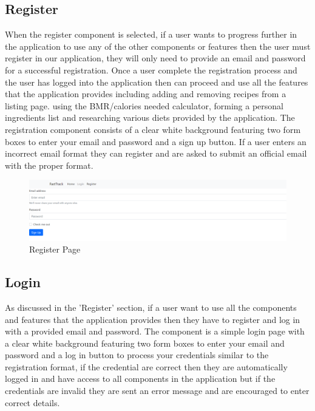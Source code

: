 \subsection{Register}

When the register component is selected, if a user wants to progress further in the application to use any of the other components or features then the user must register in our application, they will only need to provide an email and password for a successful registration. Once a user complete the registration process and the user has logged into the application then can proceed and use all the features that the application provides including adding and removing recipes from a listing page. using the BMR/calories needed calculator, forming a personal ingredients list and researching various diets provided by the application. The registration component consists of a clear white background featuring two form boxes to enter your email and password and a sign up button. If a user enters an incorrect email format they can register and are asked to submit an official email with the proper format.

\begin{center}
  \begin{figure}[H]
    \includegraphics[width=\textwidth]{img/signup.png}
    \caption{Register Page}
    \label{fig: Image of Registration Page}
  \end{figure}
\end{center}

\subsection{Login}

As discussed in the 'Register' section, if a user want to use all the components and features that the application provides then they have to register and log in with a provided email and password. The component is a simple login page with a clear white background featuring two form boxes to enter your email and password and a log in button to process your credentials similar to the registration format, if the credential are correct then they are automatically logged in and have access to all components in the application but if the credentials are invalid they are sent an error message and are encouraged to enter correct details.

